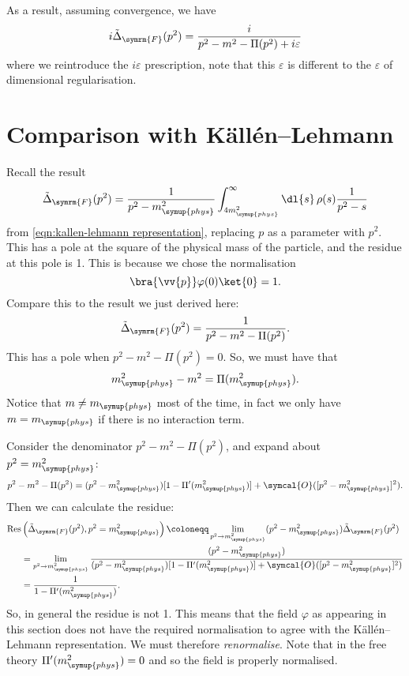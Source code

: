\documentclass[fleqn]{NotesClass}
\DeclareMathOperator{\Res}{Res}
\newcommand{\feynman}{\symrm{F}}
\newcommand{\order}{\symcal{O}}
\newcommand{\phys}{\symup{phys}}
\begin{document}
    As a result, assuming convergence, we have
    \begin{equation}
        i\tilde{\Delta}_{\feynman}(p^2) = \frac{i}{p^2 - m^2 - \Pi(p^2) + i\varepsilon}
    \end{equation}
    where we reintroduce the \(i\varepsilon\) prescription, note that this \(\varepsilon\) is different to the \(\varepsilon\) of dimensional regularisation.
    
    \section{Comparison with K\"all\'en--Lehmann}
    Recall the result
    \begin{equation}
        \tilde{\Delta}_{\feynman}(p^2) = \frac{1}{p^2 - m_{\phys}^2} \int_{4m_{\phys}^2}^{\infty} \dl{s} \, \rho(s) \frac{1}{p^2 - s}
    \end{equation}
    from \cref{eqn:kallen-lehmann representation}, replacing \(p\) as a parameter with \(p^2\).
    This has a pole at the square of the physical mass of the particle, and the residue at this pole is 1.
    This is because we chose the normalisation
    \begin{equation}
        \bra{\vv{p}} \varphi(0) \ket{0} = 1.
    \end{equation}
    Compare this to the result we just derived here:
    \begin{equation}
        \tilde{\Delta}_{\feynman}(p^2) = \frac{1}{p^2 - m^2 - \Pi(p^2)}.
    \end{equation}
    This has a pole when \(p^2 - m^2 - \Pi(p^2) = 0\).
    So, we must have that
    \begin{equation}
        m_{\phys}^2 - m^2 = \Pi(m_{\phys}^2).
    \end{equation}
    Notice that \(m \ne m_{\phys}\) most of the time, in fact we only have \(m = m_{\phys}\) if there is no interaction term.
    
    Consider the denominator \(p^2 - m^2 - \Pi(p^2)\), and expand about \(p^2 = m_{\phys}^2\):
    \begin{equation}
        p^2 - m^2 - \Pi(p^2) = (p^2 - m_{\phys}^2) [1 - \Pi'(m_{\phys}^2)] + \order([p^2 - m_{\phys}^2]^2).
    \end{equation}
    Then we can calculate the residue:
    \begin{align}
        \Res&\left( \tilde{\Delta}_{\feynman}(p^2), p^2 = m_{\phys}^2 \right) \coloneqq \lim_{p^2 \to m_{\phys}^2} (p^2 - m_{\phys}^2) \tilde{\Delta}_{\feynman}(p^2)\\
        &= \lim_{p^2 \to m_{\phys}^2} \frac{(p^2 - m_{\phys}^2)}{(p^2 - m_{\phys}^2)[1 - \Pi'(m_{\phys}^2)] + \order([p^2 - m_{\phys}^2]^2)}\\
        &= \frac{1}{1 - \Pi'(m_{\phys}^2)}.
    \end{align}
    So, in general the residue is not 1.
    This means that the field \(\varphi\) as appearing in this section does not have the required normalisation to agree with the K\"all\'en--Lehmann representation.
    We must therefore \emph{renormalise}.
    Note that in the free theory \(\Pi'(m_{\phys}^2) = 0\) and so the field is properly normalised.
    
\end{document}
